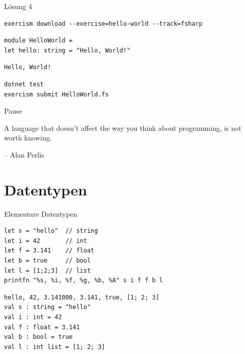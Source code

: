 \documentclass[t]{beamer}
\begin{document}
\begin{frame}[label={sec:org9ed5d74},fragile]{Lösung 4}
 \scriptsize
\begin{verbatim}
exercism download --exercise=hello-world --track=fsharp
\end{verbatim}

\begin{verbatim}
module HelloWorld =
let hello: string = "Hello, World!"
\end{verbatim}

\begin{verbatim}
Hello, World!
\end{verbatim}


\begin{verbatim}
dotnet test
exercism submit HelloWorld.fs
\end{verbatim}
\end{frame}

\begin{frame}[label={sec:org683c3bd}]{Pause}
\begin{block}{}
A language that doesn’t affect the way you think about programming, is not worth knowing.

\null\hfill-- Alan Perlis
\end{block}
\end{frame}


\section{Datentypen }
\label{sec:org78d6c4a}

\begin{frame}[label={sec:org706d93c},fragile]{Elementare Datentypen}
 \scriptsize
\begin{verbatim}
let s = "hello"  // string
let i = 42       // int
let f = 3.141    // float
let b = true     // bool
let l = [1;2;3]  // list
printfn "%s, %i, %f, %g, %b, %A" s i f f b l
\end{verbatim}

\begin{verbatim}
hello, 42, 3.141000, 3.141, true, [1; 2; 3]
val s : string = "hello"
val i : int = 42
val f : float = 3.141
val b : bool = true
val l : int list = [1; 2; 3]
\end{verbatim}
\end{frame}
\end{document}
